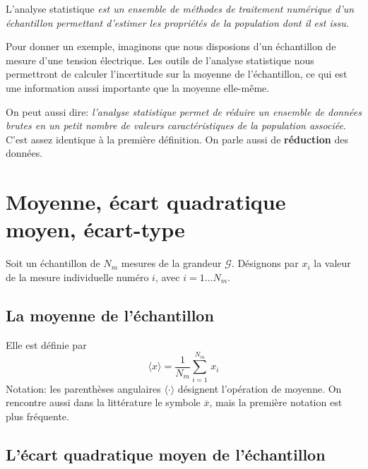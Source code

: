 L'analyse statistique \textit{est un ensemble de méthodes de traitement numérique d'un échantillon permettant d'estimer les propriétés de la population dont il est issu.}

Pour donner un exemple, imaginons que nous disposions d'un échantillon de mesure d'une tension électrique. Les outils de l'analyse statistique nous permettront de calculer l'incertitude sur la moyenne de l'échantillon, ce qui est une information aussi importante que la moyenne elle-même.

On peut aussi dire: \textit{l'analyse statistique permet de réduire un ensemble de données brutes en un petit nombre de valeurs caractéristiques de la population associée}. C'est assez identique à la première définition. On parle aussi de \textbf{réduction} des données.

\section{Moyenne, écart quadratique moyen, écart-type}

Soit un échantillon de $N_m$ mesures de la grandeur $\mathcal{G}$. Désignons par $x_i$ la valeur de la mesure individuelle numéro $i$, avec $i=1\dots N_m$.

\subsection{La moyenne de l'échantillon}

Elle est définie par
\begin{equation}
\langle x\rangle=\frac{1}{N_m}\sum\limits_{i=1}^{N_m}\,x_i
\end{equation}
Notation: les parenthèses angulaires $\langle\cdot\rangle$ désignent l'opération de moyenne. On rencontre aussi dans la littérature le symbole $\overline{x}$, mais la première notation est plus fréquente.

\subsection{L'écart quadratique moyen de l'échantillon}

